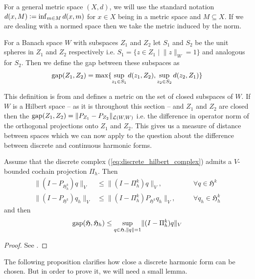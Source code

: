 \documentclass[../master_thesis.tex]{subfiles}
\begin{document}
For a general metric space $(X,d)$, we will use the standard notation 
$d(x,M) \vcentcolon= \inf_{m\in M} d(x,m)$ for $x\in X$ being in a 
metric space and $M \subseteq X$. If we are dealing with a normed space then we 
take the metric induced by the norm.

\begin{definition}
    For a Banach space $W$ with subspaces $Z_1$ and $Z_2$
    let $S_1$ and $S_2$ be the unit spheres in $Z_1$ and $Z_2$ respectively i.e.
    $S_1 = \{ z\in Z_1 \mid \lVert z \rVert _W = 1 \}$ and analogous for $S_2$.
    Then we define 
    the gap between these subspaces as 
    \begin{align*}
        \operatorname{gap}(Z_1, Z_2) = \max\{ \sup_{z_1 \in S_1} d(z_1, Z_2), \sup_{z_2 \in S_2} d(z_2, Z_1) \}
    \end{align*}
\end{definition}
This definition is from \cite[Ch.4 §2.1]{kato_perturbation_theory} and defines a metric on the set of closed subspaces
of $W$.
If $W$ is a Hilbert space -- as it is throughout this section -- and $Z_1$ and $Z_2$ are closed then
the $\operatorname{gap}(Z_1, Z_2) = \lVert P_{Z_1} - P_{Z_2} \rVert _{\mathcal{L}(W,W)}$ i.e. the difference in operator norm of the 
orthogonal projections onto $Z_1$ and $Z_2$. This gives us a measure of distance between 
spaces which we can now apply to the question about the difference between 
discrete and continuous harmonic forms.

\begin{proposition}
    Assume that the discrete complex (\ref{eq:discrete_hilbert_complex}) admits a $V$-bounded cochain projection
    $\Pi_h$. Then
    \begin{align}
        \lVert (I - P_{\mathfrak{H}^k_h}) q \rVert _V &\leq \lVert (I - \Pi_h^k) q \rVert _V, 
            &&\forall q \in \mathfrak{H}^k \label{eq:difference_identity_projection_discrete_harmonics}
        \\ \lVert (I - P_{\mathfrak{H}^k}) q_h \rVert _V 
        &\leq \lVert (I - \Pi_h^k)P_{\mathfrak{H}^k} q_h \rVert _V, \quad 
                &&\forall q_h \in \mathfrak{H}^k_h 
    \end{align}
    and then 
    \begin{align*}
        \operatorname{gap} (\mathfrak{H}, \mathfrak{H}_h) 
        \leq \sup_{q \in \mathfrak{H}, \lVert q \rVert = 1} \lVert (I - \Pi_h^k) q \rVert _V
    \end{align*}
\end{proposition}
\begin{proof}
    See \cite[Thm.\,5.2]{arnold}. 
\end{proof}
The following proposition 
clarifies how close a discrete harmonic form can be chosen. But in order to prove it, 
we will need a small lemma.
\end{document}
